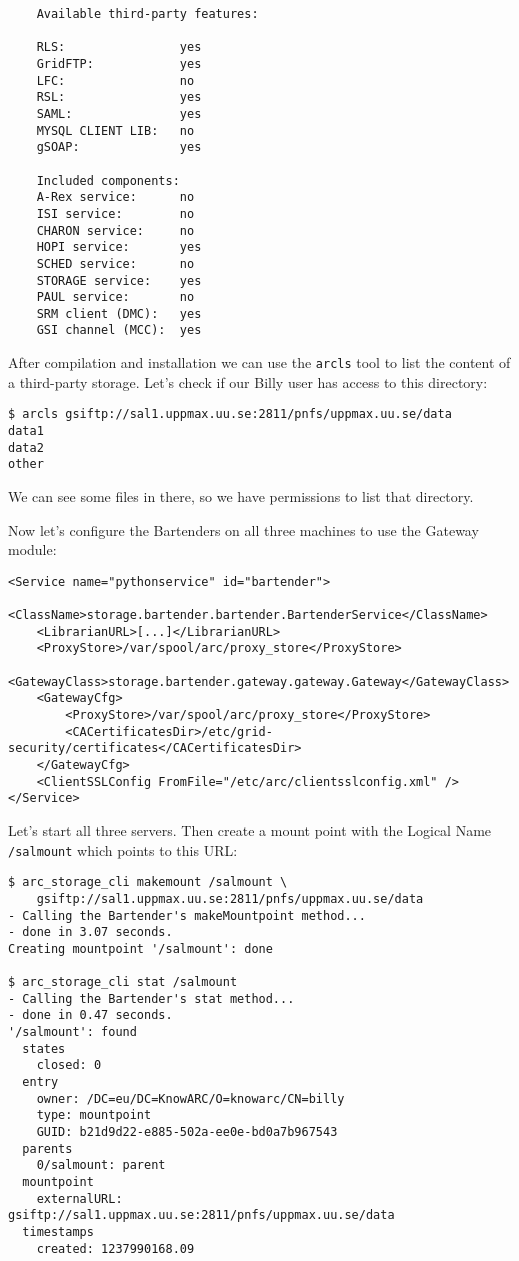 \documentclass{book}
\begin{document}
\begin{verbatim}
    Available third-party features:

    RLS:                yes
    GridFTP:            yes
    LFC:                no
    RSL:                yes
    SAML:               yes
    MYSQL CLIENT LIB:   no
    gSOAP:              yes

    Included components:
    A-Rex service:      no
    ISI service:        no
    CHARON service:     no
    HOPI service:       yes
    SCHED service:      no
    STORAGE service:    yes
    PAUL service:       no
    SRM client (DMC):   yes
    GSI channel (MCC):  yes
\end{verbatim}

After compilation and installation we can use the \verb!arcls! tool to list the content of a third-party storage. Let's check if our Billy user has access to this directory:

\begin{verbatim}
$ arcls gsiftp://sal1.uppmax.uu.se:2811/pnfs/uppmax.uu.se/data
data1
data2
other
\end{verbatim}

We can see some files in there, so we have permissions to list that directory.

Now let's configure the Bartenders on all three machines to use the Gateway module:

\begin{verbatim}
<Service name="pythonservice" id="bartender">
    <ClassName>storage.bartender.bartender.BartenderService</ClassName>
    <LibrarianURL>[...]</LibrarianURL>
    <ProxyStore>/var/spool/arc/proxy_store</ProxyStore>
    <GatewayClass>storage.bartender.gateway.gateway.Gateway</GatewayClass>
    <GatewayCfg>
        <ProxyStore>/var/spool/arc/proxy_store</ProxyStore>
        <CACertificatesDir>/etc/grid-security/certificates</CACertificatesDir>
    </GatewayCfg>
    <ClientSSLConfig FromFile="/etc/arc/clientsslconfig.xml" />
</Service>
\end{verbatim}

Let's start all three servers. Then create a mount point with the Logical Name \verb!/salmount! which points to this URL:

\begin{verbatim}
$ arc_storage_cli makemount /salmount \
    gsiftp://sal1.uppmax.uu.se:2811/pnfs/uppmax.uu.se/data
- Calling the Bartender's makeMountpoint method...
- done in 3.07 seconds.
Creating mountpoint '/salmount': done

$ arc_storage_cli stat /salmount
- Calling the Bartender's stat method...
- done in 0.47 seconds.
'/salmount': found
  states
    closed: 0
  entry
    owner: /DC=eu/DC=KnowARC/O=knowarc/CN=billy
    type: mountpoint
    GUID: b21d9d22-e885-502a-ee0e-bd0a7b967543
  parents
    0/salmount: parent
  mountpoint
    externalURL: gsiftp://sal1.uppmax.uu.se:2811/pnfs/uppmax.uu.se/data
  timestamps
    created: 1237990168.09
\end{verbatim}
\end{document}
